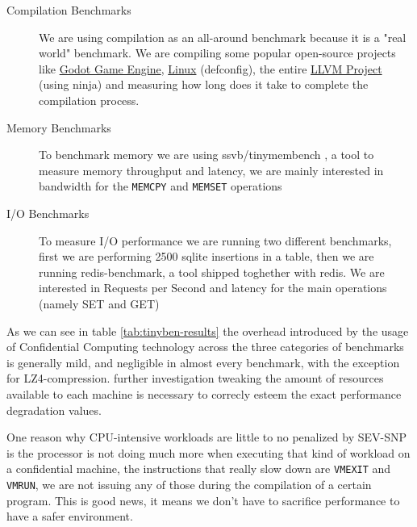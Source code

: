\documentclass[twocolumn]{article}
\begin{document}
    \begin{description}
        \item[Compilation Benchmarks] We are using compilation as an all-around benchmark because it is a "real world" benchmark. We are compiling some popular open-source projects like \href{https://github.com/godotengine/godot}{Godot Game Engine}, \href{https://git.kernel.org/pub/scm/linux/kernel/git/torvalds/linux.git}{Linux} (defconfig), the entire \href{https://github.com/llvm/llvm-project}{LLVM Project} (using ninja) and measuring how long does it take to complete the compilation process.
        \item[Memory Benchmarks] To benchmark memory we are using ssvb/tinymembench \cite{tinymembench}, a tool to measure memory throughput and latency, we are mainly interested in bandwidth for the \texttt{MEMCPY} and \texttt{MEMSET} operations
        \item[I/O Benchmarks] To measure I/O performance we are running two different benchmarks, first we are performing 2500 sqlite insertions in a table, then we are running redis-benchmark, a tool shipped toghether with redis. We are interested in Requests per Second and latency for the main operations (namely SET and GET)
    \end{description}

    As we can see in table \ref{tab:tinyben-results} the overhead introduced by the usage of Confidential Computing technology across the three categories of benchmarks is generally mild, and negligible in almost every benchmark, with the exception for LZ4-compression. further investigation tweaking the amount of resources available to each machine is necessary to correcly esteem the exact performance degradation values.

    One reason why CPU-intensive workloads are little to no penalized by SEV-SNP is the processor is not doing much more when executing that kind of workload on a confidential machine, the instructions that really slow down are \texttt{VMEXIT} and \texttt{VMRUN}, we are not issuing any of those during the compilation of a certain program. This is good news, it means we don't have to sacrifice performance to have a safer environment.
\end{document}
